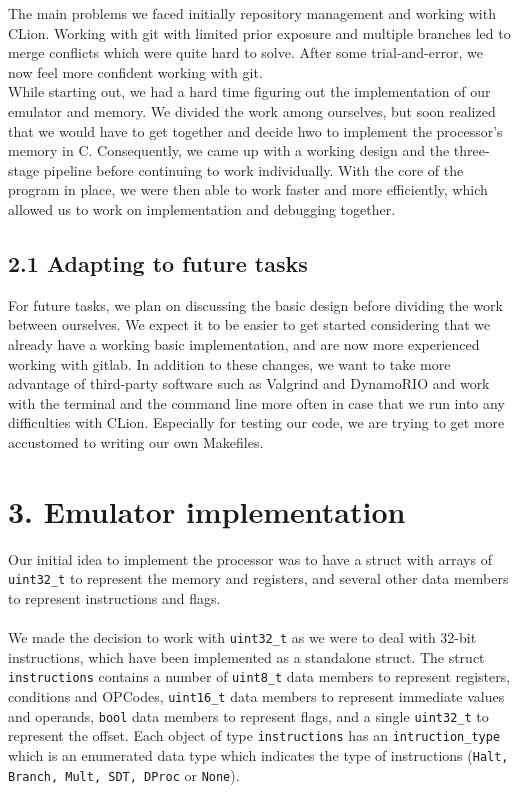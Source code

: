 \documentclass[a4paper, twoside]{report}
\begin{document}
The main problems we faced initially repository management and working with CLion. Working with git with limited prior exposure and multiple branches led to merge conflicts which were quite hard to solve. After some trial-and-error, we now feel more confident working with git. \\ 
While starting out, we had a hard time figuring out the implementation of our emulator and memory. We divided the work among ourselves, but soon realized that we would have to get together and decide hwo to implement the processor's memory in C. Consequently, we came up with a working design and the three-stage pipeline before continuing to work individually. With the core of the program in place, we were then able to work faster and more efficiently, which allowed us to work on implementation and debugging together. 
\subsection*{2.1 Adapting to future tasks}
For future tasks, we plan on discussing the basic design before dividing the work between ourselves. We expect it to be easier to get started considering that we already have a working basic implementation, and are now more experienced working with gitlab. In addition to these changes, we want to take more advantage of third-party software such as Valgrind and DynamoRIO and work with the terminal and the command line more often in case that we run into any difficulties with CLion. Especially for testing our code, we are trying to get more accustomed to writing our own Makefiles.



\section*{}

\section*{3. Emulator implementation}
Our initial idea to implement the processor was to have a struct with arrays of \verb|uint32_t| to represent the memory and registers, and several other data members to represent instructions and flags. \\ \\
We made the decision to work with \verb|uint32_t| as we were to deal with 32-bit instructions, which have been implemented as a standalone struct. The struct \verb|instructions| contains a number of \verb|uint8_t| data members to represent registers, conditions and OPCodes, \verb|uint16_t| data members to represent immediate values and operands, \verb|bool| data members to represent flags, and a single \verb|uint32_t| to represent the offset. Each object of type \verb|instructions| has an \verb|intruction_type| which is an enumerated data type which indicates the type of instructions (\verb|Halt, Branch, Mult, SDT, DProc| or \verb|None|). \\
\end{document}
